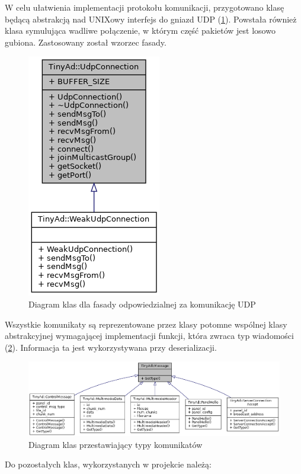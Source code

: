 \documentclass[12pt, a4paper]{article}
\begin{document}
W celu ułatwienia implementacji protokołu komunikacji, przygotowano klasę będącą abstrakcją nad UNIXowy interfejs do gniazd UDP (\ref{fig:class_diagram2}). Powstała również klasa symulująca wadliwe połączenie, w którym część pakietów jest losowo gubiona. Zastosowany został wzorzec fasady.

\begin{figure}[H]
\centering
\includegraphics[width=0.15\linewidth]{class_diagram2}
\caption{Diagram klas dla fasady odpowiedzialnej za komunikację UDP}
\label{fig:class_diagram2}
\end{figure}
Wszystkie komunikaty są reprezentowane przez klasy potomne wspólnej klasy abstrakcyjnej wymagającej implementacji funkcji, która zwraca typ wiadomości (\ref{fig:class_diagram1}). Informacja ta jest wykorzystywana przy deserializacji.

\begin{figure}[H]
\centering
\includegraphics[width=0.9\linewidth]{class_diagram1}
\caption{Diagram klas przestawiający typy komunikatów}
\label{fig:class_diagram1}
\end{figure}
Do pozostałych klas, wykorzystanych w projekcie należą:
\end{document}
